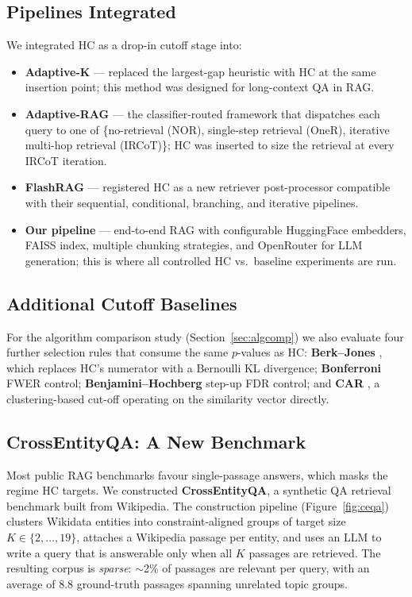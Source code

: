 \documentclass[letterpaper]{article}
\begin{document}
\subsection{Pipelines Integrated}
We integrated HC as a drop-in cutoff stage into:
\begin{itemize}
\item \textbf{Adaptive-K} \cite{adaptivek2025} --- replaced the
largest-gap heuristic with HC at the same insertion point;
this method was designed for long-context QA in RAG.
\item \textbf{Adaptive-RAG} \cite{jeong2024adaptiverag} --- the
classifier-routed framework that dispatches each query to one of
\{no-retrieval (NOR), single-step retrieval (OneR), iterative
multi-hop retrieval (IRCoT)\}; HC was inserted to size the
retrieval at every IRCoT iteration.
\item \textbf{FlashRAG} \cite{jin2025flashrag} --- registered HC as a
new retriever post-processor compatible with their sequential,
conditional, branching, and iterative pipelines.
\item \textbf{Our pipeline} --- end-to-end RAG with configurable
HuggingFace embedders, FAISS index, multiple chunking strategies, and
OpenRouter for LLM generation; this is where all controlled HC vs.\
baseline experiments are run.
\end{itemize}

\subsection{Additional Cutoff Baselines}
For the algorithm comparison study (Section~\ref{sec:algcomp}) we
also evaluate four further selection rules that consume the same
$p$-values as HC: \textbf{Berk--Jones} \cite{berkjones1979}, which
replaces HC's numerator with a Bernoulli KL divergence;
\textbf{Bonferroni} \cite{bonferroni1961dunn} FWER control;
\textbf{Benjamini--Hochberg} \cite{benjamini1995fdr} step-up FDR
control; and \textbf{CAR} \cite{xu2025car}, a clustering-based
cut-off operating on the similarity vector directly.

\subsection{CrossEntityQA: A New Benchmark}
Most public RAG benchmarks favour single-passage answers, which masks
the regime HC targets. We constructed \textbf{CrossEntityQA}, a
synthetic QA retrieval benchmark built from Wikipedia. The construction
pipeline (Figure~\ref{fig:ceqa}) clusters Wikidata entities into
constraint-aligned groups of target size $K \in \{2, \dots, 19\}$,
attaches a Wikipedia passage per entity, and uses an LLM to write a
query that is answerable only when all $K$ passages are retrieved.
The resulting corpus is \emph{sparse}: $\sim$2\% of passages are
relevant per query, with an average of 8.8 ground-truth passages
spanning unrelated topic groups.
\end{document}
